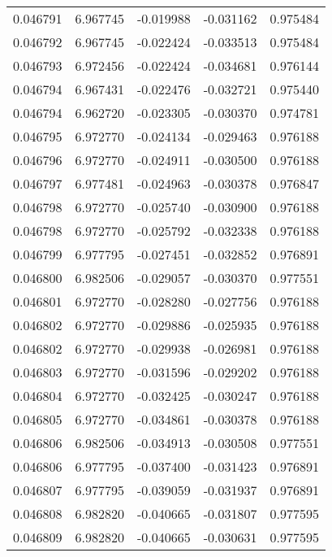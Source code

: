 \begin{tabular}{lrrrr}
0.046791    &  6.967745 & -0.019988 & -0.031162 &             0.975484 \\
0.046792    &  6.967745 & -0.022424 & -0.033513 &             0.975484 \\
0.046793    &  6.972456 & -0.022424 & -0.034681 &             0.976144 \\
0.046794    &  6.967431 & -0.022476 & -0.032721 &             0.975440 \\
0.046794    &  6.962720 & -0.023305 & -0.030370 &             0.974781 \\
0.046795    &  6.972770 & -0.024134 & -0.029463 &             0.976188 \\
0.046796    &  6.972770 & -0.024911 & -0.030500 &             0.976188 \\
0.046797    &  6.977481 & -0.024963 & -0.030378 &             0.976847 \\
0.046798    &  6.972770 & -0.025740 & -0.030900 &             0.976188 \\
0.046798    &  6.972770 & -0.025792 & -0.032338 &             0.976188 \\
0.046799    &  6.977795 & -0.027451 & -0.032852 &             0.976891 \\
0.046800    &  6.982506 & -0.029057 & -0.030370 &             0.977551 \\
0.046801    &  6.972770 & -0.028280 & -0.027756 &             0.976188 \\
0.046802    &  6.972770 & -0.029886 & -0.025935 &             0.976188 \\
0.046802    &  6.972770 & -0.029938 & -0.026981 &             0.976188 \\
0.046803    &  6.972770 & -0.031596 & -0.029202 &             0.976188 \\
0.046804    &  6.972770 & -0.032425 & -0.030247 &             0.976188 \\
0.046805    &  6.972770 & -0.034861 & -0.030378 &             0.976188 \\
0.046806    &  6.982506 & -0.034913 & -0.030508 &             0.977551 \\
0.046806    &  6.977795 & -0.037400 & -0.031423 &             0.976891 \\
0.046807    &  6.977795 & -0.039059 & -0.031937 &             0.976891 \\
0.046808    &  6.982820 & -0.040665 & -0.031807 &             0.977595 \\
0.046809    &  6.982820 & -0.040665 & -0.030631 &             0.977595 \\

\end{tabular}
